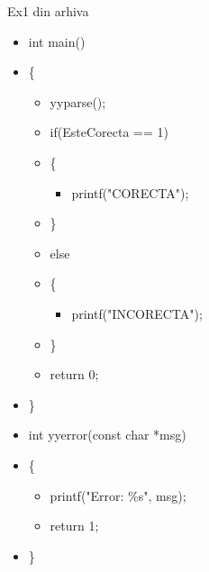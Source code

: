 \documentclass[pdf]{beamer}
\begin{document}
\begin{frame}{Ex1 din arhiva}
\begin{itemize}
	\item[]
	int main()

	\item[]
	\{

		\begin{itemize}
			\item[]
			yyparse();

			\item[]
			if(EsteCorecta == 1)

			\item[]
			\{
				
				\begin{itemize}
					\item[]
					printf("CORECTA");
				\end{itemize}

			\item[]
			\}

			\item[]
			else

			\item[]
			\{
				
				\begin{itemize}
					\item[]
					printf("INCORECTA");
				\end{itemize}

			\item[]
			\}

			\item[]
			return 0;
		\end{itemize}

	\item[]
	\}
		\linebreak

	\item[]
	int yyerror(const char *msg)

	\item[]
	\{

		\begin{itemize}
			\item[]
			printf("Error: \%s", msg);

			\item[]
			return 1;
		\end{itemize}

	\item[]
	\}

\end{itemize}
\end{frame}
\end{document}
